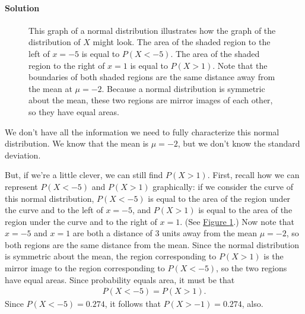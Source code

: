 \documentclass[letterpaper,10pt,english]{jupyterBook}
\begin{document}
\paragraph{Solution}
\label{\detokenize{Ch4 The Normal Distribution and the Central Limit Theorem/4.1 Properties of the Normal Distribution:id1}}
\begin{figure}[htbp]
\centering
\capstart

\noindent{}
\caption{This graph of a normal distribution illustrates how the graph of the distribution of \(X\) might look. The area of the shaded region to the left of \(x = -5\) is equal to \(P(X < -5)\). The area of the shaded region to the right of \(x = 1\) is equal to \(P(X > 1)\). Note that the boundaries of both shaded regions are the same distance away from the mean at \(\mu = -2\). Because a normal distribution is symmetric about the mean, these two regions are mirror images of each other, so they have equal areas.}\label{\detokenize{Ch4 The Normal Distribution and the Central Limit Theorem/4.1 Properties of the Normal Distribution:normal-ex2}}\end{figure}

\sphinxAtStartPar
We don’t have all the information we need to fully characterize this normal distribution. We know that the mean is \(\mu = -2\), but we don’t know the standard deviation.

\sphinxAtStartPar
But, if we’re a little clever, we can still find \(P(X > 1)\). First, recall how we can represent \(P(X < -5)\) and \(P(X > 1)\) graphically: if we consider the curve of this normal distribution, \(P(X < -5)\) is equal to the area of the region under the curve and to the left of \(x = -5\), and \(P(X > 1)\) is equal to the area of the region under the curve and to the right of \(x = 1\). (See \hyperref[\detokenize{Ch4 The Normal Distribution and the Central Limit Theorem/4.1 Properties of the Normal Distribution:normal-ex2}]{Figure \ref{\detokenize{Ch4 The Normal Distribution and the Central Limit Theorem/4.1 Properties of the Normal Distribution:normal-ex2}}}.)  Now note that \(x = -5\) and \(x = 1\) are both a distance of \(3\) units away from the mean \(\mu = -2\), so both regions are the same distance from the mean. Since the normal distribution is symmetric about the mean, the region corresponding to \(P(X > 1)\) is the mirror image to the region corresponding to \(P(X < -5)\), so the two regions have equal areas. Since probability equals area, it must be that
\begin{equation*}
\begin{split} P(X < -5) = P(X > 1). \end{split}
\end{equation*}
\sphinxAtStartPar
Since \(P(X < -5) = 0.274\), it follows that \(P(X > -1) = 0.274\), also.
\end{document}
